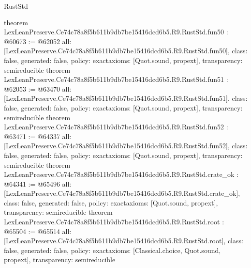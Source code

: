 \begin{lexlean}{RustStd}
\begin{coremodule}
{}
theorem LexLeanPreserve.Ce74c78a8f5b611b9db7be15416dcd6b5.R9.RustStd.fun50 : @60673 := @62052 {
  all: [LexLeanPreserve.Ce74c78a8f5b611b9db7be15416dcd6b5.R9.RustStd.fun50],
  class: false,
  generated: false,
  policy: exact{axioms: [Quot.sound, propext]},
  transparency: semireducible
}
theorem LexLeanPreserve.Ce74c78a8f5b611b9db7be15416dcd6b5.R9.RustStd.fun51 : @62053 := @63470 {
  all: [LexLeanPreserve.Ce74c78a8f5b611b9db7be15416dcd6b5.R9.RustStd.fun51],
  class: false,
  generated: false,
  policy: exact{axioms: [Quot.sound, propext]},
  transparency: semireducible
}
theorem LexLeanPreserve.Ce74c78a8f5b611b9db7be15416dcd6b5.R9.RustStd.fun52 : @63471 := @64337 {
  all: [LexLeanPreserve.Ce74c78a8f5b611b9db7be15416dcd6b5.R9.RustStd.fun52],
  class: false,
  generated: false,
  policy: exact{axioms: [Quot.sound, propext]},
  transparency: semireducible
}
theorem LexLeanPreserve.Ce74c78a8f5b611b9db7be15416dcd6b5.R9.RustStd.crate_ok : @64341 := @65496 {
  all: [LexLeanPreserve.Ce74c78a8f5b611b9db7be15416dcd6b5.R9.RustStd.crate_ok],
  class: false,
  generated: false,
  policy: exact{axioms: [Quot.sound, propext]},
  transparency: semireducible
}
theorem LexLeanPreserve.Ce74c78a8f5b611b9db7be15416dcd6b5.R9.RustStd.root : @65504 := @65514 {
  all: [LexLeanPreserve.Ce74c78a8f5b611b9db7be15416dcd6b5.R9.RustStd.root],
  class: false,
  generated: false,
  policy: exact{axioms: [Classical.choice, Quot.sound, propext]},
  transparency: semireducible
}


\end{coremodule}
\end{lexlean}
